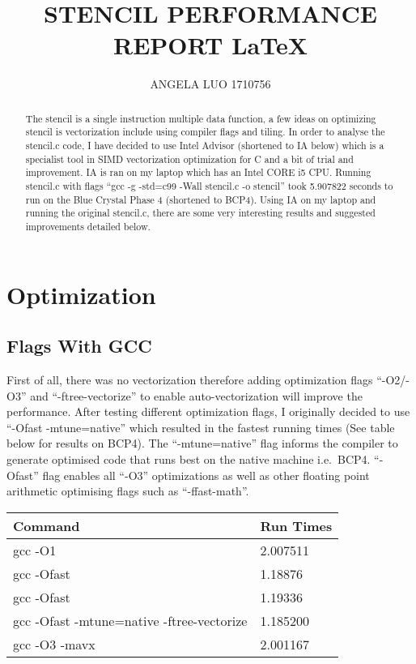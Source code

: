\documentclass{article}
\begin{document}
\title{STENCIL PERFORMANCE REPORT \LaTeX{}}
\author{ANGELA LUO 1710756}

\begin{abstract}
  The stencil is a single instruction multiple data function, a few ideas on optimizing stencil is vectorization include
  using compiler flags and tiling. In order to analyse the
  stencil.c code, I have decided to use Intel Advisor (shortened to IA
  below) which is a specialist tool in SIMD vectorization optimization for
  C and a bit of trial and improvement. IA is ran on my laptop which has
  an Intel CORE i5 CPU. Running stencil.c with flags ``gcc -g -std=c99
  -Wall stencil.c -o stencil'' took 5.907822 seconds to run on the Blue
  Crystal Phase 4 (shortened to BCP4). Using IA on my laptop and running
  the original stencil.c, there are some very interesting results and
  suggested improvements detailed below.
\end{abstract}

\section{Optimization}

\subsection{Flags With GCC}

First of all, there was no vectorization therefore adding optimization
flags ``-O2/-O3'' and ``-ftree-vectorize'' to enable auto-vectorization
will improve the performance. After testing different optimization
flags, I originally decided to use ``-Ofast -mtune=native'' which
resulted in the fastest running times (See table below for results on
BCP4). The ``-mtune=native'' flag informs the compiler to generate
optimised code that runs best on the native machine i.e.~BCP4.
``-Ofast'' flag enables all ``-O3'' optimizations as well as other
floating point arithmetic optimising flags such as ``-ffast-math''.

\begin{table}[H]
\centering
\begin{tabular}{@{}ll@{}}
\toprule
Command                                                  & Run Times \\ \midrule
gcc -O1                                                  & 2.007511  \\
gcc -Ofast                                               & 1.18876   \\
gcc -Ofast                                               & 1.19336   \\
gcc -Ofast -mtune=native -ftree-vectorize                & 1.185200  \\
gcc -O3 -mavx                                            & 2.001167  \\ \bottomrule
\end{tabular}
\end{table}
\end{document}

